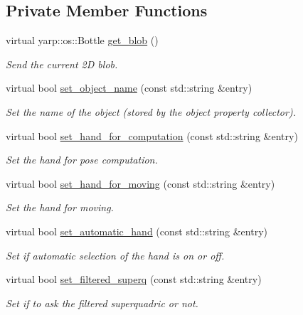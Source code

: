 \subsection*{Private Member Functions}
\begin{DoxyCompactItemize}
\item 
virtual yarp\-::os\-::\-Bottle \hyperlink{classexperimentOne__IDL_a4e631c4039aa9e4685f7d75f778145a2}{get\-\_\-blob} ()
\begin{DoxyCompactList}\small\item\em Send the current 2\-D blob. \end{DoxyCompactList}\item 
virtual bool \hyperlink{classexperimentOne__IDL_a3ba4eae42268c1dec8c90a971ffde7af}{set\-\_\-object\-\_\-name} (const std\-::string \&entry)
\begin{DoxyCompactList}\small\item\em Set the name of the object (stored by the object property collector). \end{DoxyCompactList}\item 
virtual bool \hyperlink{classexperimentOne__IDL_acb2bfe937ed1900166744fce3a8f4cab}{set\-\_\-hand\-\_\-for\-\_\-computation} (const std\-::string \&entry)
\begin{DoxyCompactList}\small\item\em Set the hand for pose computation. \end{DoxyCompactList}\item 
virtual bool \hyperlink{classexperimentOne__IDL_a0422e6ffaef0e60e1a557a342aeb5d4a}{set\-\_\-hand\-\_\-for\-\_\-moving} (const std\-::string \&entry)
\begin{DoxyCompactList}\small\item\em Set the hand for moving. \end{DoxyCompactList}\item 
virtual bool \hyperlink{classexperimentOne__IDL_a1612f36ed85af9e6dbc595405e733977}{set\-\_\-automatic\-\_\-hand} (const std\-::string \&entry)
\begin{DoxyCompactList}\small\item\em Set if automatic selection of the hand is on or off. \end{DoxyCompactList}\item 
virtual bool \hyperlink{classexperimentOne__IDL_a36a7306993eeae5778bacac4f4154126}{set\-\_\-filtered\-\_\-superq} (const std\-::string \&entry)
\begin{DoxyCompactList}\small\item\em Set if to ask the filtered superquadric or not. \end{DoxyCompactList}\item 

\end{DoxyCompactItemize}
